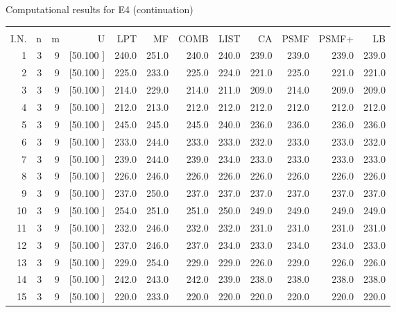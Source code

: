 \documentclass[12pt,a4paper]{article}
\begin{document}
\newpage
\begin{center}
 Computational results for E4 (continuation) {\tiny
\begin{tabular}{r r r r r r r r r r r r}\hline
    &   &   &          &        &        &        &        &        &        &        &       \\[-0.1in]
  I.N.  &  n  &  m  &  U  &  LPT  &  MF  &  COMB  &  LIST  &  CA  & PSMF &PSMF+ & LB \\[0.03in]
\hline
   1&  3&  9&[50.100    ]&   240.0&   251.0&   240.0&   240.0&   239.0&   239.0&   239.0&   239.0\\[-0.02in]
   2&  3&  9&[50.100    ]&   225.0&   233.0&   225.0&   224.0&   221.0&   225.0&   221.0&   221.0\\[-0.02in]
   3&  3&  9&[50.100    ]&   214.0&   229.0&   214.0&   211.0&   209.0&   214.0&   209.0&   209.0\\[-0.02in]
   4&  3&  9&[50.100    ]&   212.0&   213.0&   212.0&   212.0&   212.0&   212.0&   212.0&   212.0\\[-0.02in]
   5&  3&  9&[50.100    ]&   245.0&   245.0&   245.0&   240.0&   236.0&   236.0&   236.0&   236.0\\[-0.02in]
   6&  3&  9&[50.100    ]&   233.0&   244.0&   233.0&   233.0&   232.0&   233.0&   233.0&   232.0\\[-0.02in]
   7&  3&  9&[50.100    ]&   239.0&   244.0&   239.0&   234.0&   233.0&   233.0&   233.0&   233.0\\[-0.02in]
   8&  3&  9&[50.100    ]&   226.0&   246.0&   226.0&   226.0&   226.0&   226.0&   226.0&   226.0\\[-0.02in]
   9&  3&  9&[50.100    ]&   237.0&   250.0&   237.0&   237.0&   237.0&   237.0&   237.0&   237.0\\[-0.02in]
  10&  3&  9&[50.100    ]&   254.0&   251.0&   251.0&   250.0&   249.0&   249.0&   249.0&   249.0\\[-0.02in]
  11&  3&  9&[50.100    ]&   232.0&   246.0&   232.0&   232.0&   231.0&   231.0&   231.0&   231.0\\[-0.02in]
  12&  3&  9&[50.100    ]&   237.0&   246.0&   237.0&   234.0&   233.0&   234.0&   234.0&   233.0\\[-0.02in]
  13&  3&  9&[50.100    ]&   229.0&   254.0&   229.0&   229.0&   226.0&   229.0&   226.0&   226.0\\[-0.02in]
  14&  3&  9&[50.100    ]&   242.0&   243.0&   242.0&   239.0&   238.0&   238.0&   238.0&   238.0\\[-0.02in]
  15&  3&  9&[50.100    ]&   220.0&   233.0&   220.0&   220.0&   220.0&   220.0&   220.0&   220.0\\[-0.02in]

\end{tabular}}
\end{center}
\end{document}
